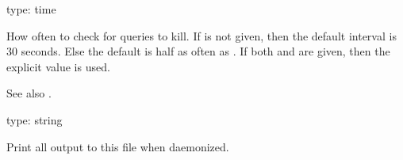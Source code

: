 \documentclass[letterpaper,10pt,english]{sphinxmanual}
\begin{document}
\begin{fulllineitems}
\label{\detokenize{mariadb-kill:cmdoption-mariadb-kill-interval}}
\sphinxAtStartPar
type: time

\sphinxAtStartPar
How often to check for queries to kill.  If {\hyperref[\detokenize{mariadb-kill:cmdoption-mariadb-kill-busy-time}]{}} is not given,
then the default interval is 30 seconds.  Else the default is half as often
as {\hyperref[\detokenize{mariadb-kill:cmdoption-mariadb-kill-busy-time}]{}}.  If both {\hyperref[\detokenize{mariadb-kill:cmdoption-mariadb-kill-interval}]{}} and {\hyperref[\detokenize{mariadb-kill:cmdoption-mariadb-kill-busy-time}]{}} are given,
then the explicit {\hyperref[\detokenize{mariadb-kill:cmdoption-mariadb-kill-interval}]{}} value is used.

\sphinxAtStartPar
See also {\hyperref[\detokenize{mariadb-kill:cmdoption-mariadb-kill-run-time}]{}}.

\end{fulllineitems}


\begin{fulllineitems}
\label{\detokenize{mariadb-kill:cmdoption-mariadb-kill-log}}
\sphinxAtStartPar
type: string

\sphinxAtStartPar
Print all output to this file when daemonized.

\end{fulllineitems}
\end{document}
